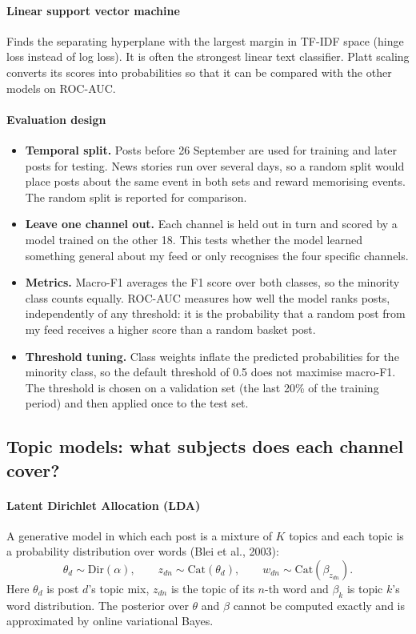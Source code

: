\documentclass[11pt,a4paper]{article}
\begin{document}
\paragraph{Linear support vector machine} Finds the separating hyperplane with the largest margin in TF-IDF space (hinge loss instead of log loss). It is often the strongest linear text classifier. Platt scaling converts its scores into probabilities so that it can be compared with the other models on ROC-AUC.

\paragraph{Evaluation design}
\begin{itemize}
\item \textbf{Temporal split.} Posts before 26 September are used for training and later posts for testing. News stories run over several days, so a random split would place posts about the same event in both sets and reward memorising events. The random split is reported for comparison.
\item \textbf{Leave one channel out.} Each channel is held out in turn and scored by a model trained on the other 18. This tests whether the model learned something general about my feed or only recognises the four specific channels.
\item \textbf{Metrics.} Macro-F1 averages the F1 score over both classes, so the minority class counts equally. ROC-AUC measures how well the model ranks posts, independently of any threshold: it is the probability that a random post from my feed receives a higher score than a random basket post.
\item \textbf{Threshold tuning.} Class weights inflate the predicted probabilities for the minority class, so the default threshold of 0.5 does not maximise macro-F1. The threshold is chosen on a validation set (the last 20\% of the training period) and then applied once to the test set.
\end{itemize}

\subsection{Topic models: what subjects does each channel cover?}
\paragraph{Latent Dirichlet Allocation (LDA)} A generative model in which each post is a mixture of $K$ topics and each topic is a probability distribution over words (Blei et al., 2003):
\begin{equation}
\theta_d \sim \mathrm{Dir}(\alpha), \qquad z_{dn} \sim \mathrm{Cat}(\theta_d), \qquad w_{dn} \sim \mathrm{Cat}(\beta_{z_{dn}}).
\end{equation}
Here $\theta_d$ is post $d$'s topic mix, $z_{dn}$ is the topic of its $n$-th word and $\beta_k$ is topic $k$'s word distribution. The posterior over $\theta$ and $\beta$ cannot be computed exactly and is approximated by online variational Bayes.
\end{document}
